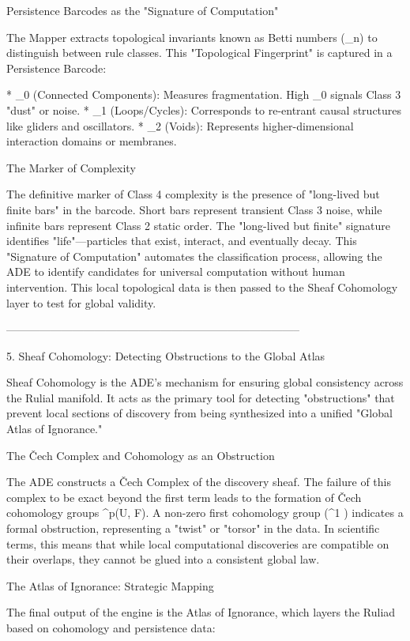 Persistence Barcodes as the "Signature of Computation"

The Mapper extracts topological invariants known as Betti numbers (\beta_n) to distinguish between rule classes. This "Topological Fingerprint" is captured in a Persistence Barcode:

* \beta_0 (Connected Components): Measures fragmentation. High \beta_0 signals Class 3 "dust" or noise.
* \beta_1 (Loops/Cycles): Corresponds to re-entrant causal structures like gliders and oscillators.
* \beta_2 (Voids): Represents higher-dimensional interaction domains or membranes.

The Marker of Complexity

The definitive marker of Class 4 complexity is the presence of "long-lived but finite bars" in the barcode. Short bars represent transient Class 3 noise, while infinite bars represent Class 2 static order. The "long-lived but finite" signature identifies "life"—particles that exist, interact, and eventually decay. This "Signature of Computation" automates the classification process, allowing the ADE to identify candidates for universal computation without human intervention. This local topological data is then passed to the Sheaf Cohomology layer to test for global validity.


--------------------------------------------------------------------------------


5. Sheaf Cohomology: Detecting Obstructions to the Global Atlas

Sheaf Cohomology is the ADE’s mechanism for ensuring global consistency across the Rulial manifold. It acts as the primary tool for detecting "obstructions" that prevent local sections of discovery from being synthesized into a unified "Global Atlas of Ignorance."

The Čech Complex and Cohomology as an Obstruction

The ADE constructs a Čech Complex of the discovery sheaf. The failure of this complex to be exact beyond the first term leads to the formation of Čech cohomology groups ^p(U, F). A non-zero first cohomology group (^1 ) indicates a formal obstruction, representing a "twist" or "torsor" in the data. In scientific terms, this means that while local computational discoveries are compatible on their overlaps, they cannot be glued into a consistent global law.

The Atlas of Ignorance: Strategic Mapping

The final output of the engine is the Atlas of Ignorance, which layers the Ruliad based on cohomology and persistence data:

